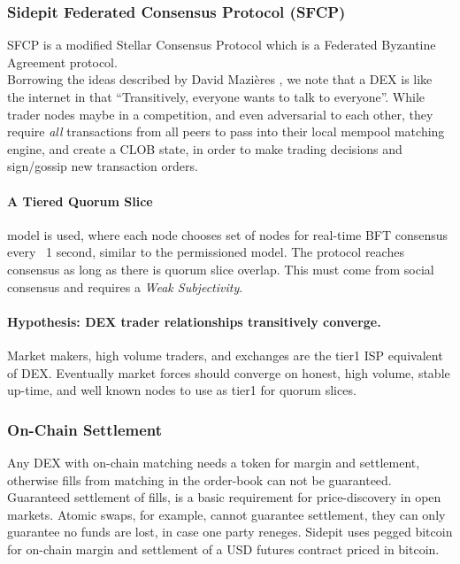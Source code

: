 \documentclass[12pt]{article}
\begin{document}
\subsubsection*{Sidepit Federated Consensus Protocol (SFCP) } 
SFCP is a modified Stellar Consensus Protocol \cite{thestellar} which is a Federated Byzantine Agreement protocol. \\

Borrowing the ideas described by David Mazières \cite{thestellar}, we note that a DEX is like the internet in that ``Transitively, everyone wants to talk to everyone''. While trader nodes maybe in a competition, and even adversarial to each other, they require \emph{all} transactions from all peers to pass into their local mempool matching engine, and create a CLOB state, in order to make trading decisions and sign/gossip new transaction orders.        

\paragraph{A Tiered Quorum Slice} model is used, where each node chooses set of nodes for real-time BFT consensus every ~1 second, similar to the permissioned model. The protocol reaches consensus as long as there is quorum slice overlap. This must come from social consensus and requires a \emph{Weak Subjectivity}.   

\paragraph{Hypothesis: DEX trader relationships transitively converge.} Market makers, high volume traders, and exchanges are the tier1 ISP equivalent of DEX. Eventually market forces should converge on honest, high volume, stable up-time, and well known nodes to use as tier1 for quorum slices.

\subsubsection*{On-Chain Settlement}
Any DEX with on-chain matching needs a token for margin and settlement, otherwise fills from matching in the order-book can not be guaranteed. Guaranteed settlement of fills, is a basic requirement for price-discovery in open markets. Atomic swaps, for example, cannot guarantee settlement, they can only guarantee no funds are lost, in case one party reneges. Sidepit uses pegged bitcoin for on-chain margin and settlement of a USD futures contract priced in bitcoin.    
 
\newpage
{}
% 

\end{document}
